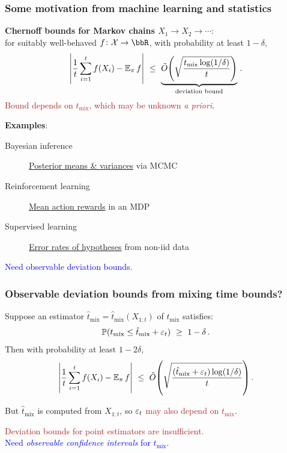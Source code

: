 \documentclass[11pt,compress,blue4,notheorem]{beamer}
\newcommand{\BLUE}[1]{\textcolor{blue}{#1}}
\newcommand{\FIREBRICK}[1]{\textcolor{firebrick}{#1}}
\newcommand\tmix{\ensuremath{t_{\operatorname{mix}}}}
\newcommand\tmixhat{\ensuremath{\hat{t}_{\operatorname{mix}}}}
\newcommand\states{\ensuremath{\mathcal{X}}}
\begin{document}
\begin{frame}
  \frametitle{Some motivation from machine learning and statistics}

  \textbf{Chernoff bounds for Markov chains $X_1\to X_2\to\dotsb$}:
  \\
  for suitably well-behaved $f \colon \states \to \bbR$,
  with probability at least $1-\delta$,
  \[
    \Abs{
      \frac1t\sum_{i=1}^t f(X_i)
      -
      \E_\pi f
    }
    \ \leq \
    \underbrace{
      \tilde O\Parens{
        \sqrt{
          \frac{\tmix \log(1/\delta)}{t}
        }
      }
    }_{\text{deviation bound}}
    \,.
  \]
  \FIREBRICK{Bound depends on $\tmix$, which may be unknown \emph{a
  priori}}.

  \bigskip
  \textbf{Examples}:
  \begin{description}
    \item[Bayesian inference]
      \underline{Posterior means \& variances} via MCMC

    \item[Reinforcement learning]
      \underline{Mean action rewards} in an MDP

    \item[Supervised learning]
      \underline{Error rates of hypotheses} from non-iid data

  \end{description}

  \begin{center}
    \BLUE{%
      Need observable deviation bounds.
    }
  \end{center}

\end{frame}


\begin{frame}
  \frametitle{Observable deviation bounds from mixing time bounds?}

  Suppose an estimator $\tmixhat = \tmixhat(X_{1:t})$ of
  $\tmix$ satisfies:
  \[
    \P(\tmix \leq \tmixhat + \veps_t)
    \ \geq \
    1-\delta
    \,.
  \]
  \onslide<2->
  Then with probability at least $1-2\delta$,
  \[
    \Abs{
      \frac1t\sum_{i=1}^t f(X_i)
      -
      \E_\pi f
    }
    \ \leq \
    \tilde O\Parens{
      \sqrt{
        \frac{\parens{\tmixhat + \veps_t} \log(1/\delta)}{t}
      }
    }
    \,.
  \]

  But $\tmixhat$ is computed from $X_{1:t}$, so
  \FIREBRICK{$\varepsilon_t$ may also depend on $\tmix$}.

  \onslide<4->
  \begin{center}
    \FIREBRICK{%
      Deviation bounds for point estimators are insufficient.%
    }
    \\
    \BLUE{%
      Need \emph{observable confidence intervals} for $\tmix$.%
    }
  \end{center}

\end{frame}
\end{document}
